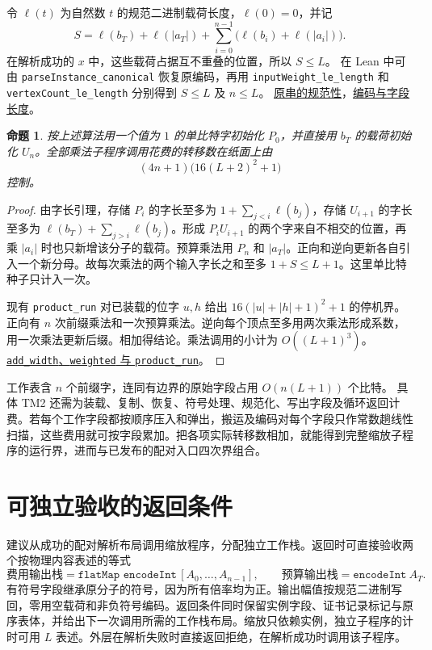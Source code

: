 \documentclass[UTF8,fontset=fandol,11pt,a4paper]{ctexart}
\newtheorem{proposition}{命题}
\newcommand{\len}[1]{\lvert #1\rvert}
\newcommand{\src}[2]{\href{https://github.com/huam54925-cpu/uav-routing-certification/blob/b083efc56ecf5b4f96f2e5b06134d1ed05806351/LeanCompletion/UAV/#1.lean}{#2}}
\begin{document}
令 \(\ell(t)\) 为自然数 \(t\) 的规范二进制载荷长度，\(\ell(0)=0\)，并记
\[
 S=\ell(b_T)+\ell(\lvert a_T\rvert)
   +\sum_{i=0}^{n-1}\bigl(\ell(b_i)+\ell(\lvert a_i\rvert)\bigr).
\]
在解析成功的 \(x\) 中，这些载荷占据互不重叠的位置，所以 \(S\le L\)。
在 Lean 中可由 \texttt{parseInstance\_canonical} 恢复原编码，再用
\texttt{inputWeight\_le\_length} 和 \texttt{vertexCount\_le\_length}
分别得到 \(S\le L\) 及 \(n\le L\)。
\src{TreeBudgetSparseVerifier}{原串的规范性}，\src{TreeBudgetBinaryCodec}{编码与字段长度}。

\begin{proposition}
按上述算法用一个值为 \(1\) 的单比特字初始化 \(P_0\)，并直接用 \(b_T\) 的载荷初始化 \(U_n\)。全部乘法子程序调用花费的转移数在纸面上由
\[
       (4n+1)\bigl(16(L+2)^2+1\bigr)
\]
控制。
\end{proposition}
\begin{proof}
由字长引理，存储 \(P_i\) 的字长至多为
\(1+\sum_{j<i}\ell(b_j)\)，存储 \(U_{i+1}\) 的字长至多为
\(\ell(b_T)+\sum_{j>i}\ell(b_j)\)。形成 \(P_iU_{i+1}\) 的两个字来自不相交的位置，再乘 \(\lvert a_i\rvert\) 时也只新增该分子的载荷。预算乘法用 \(P_n\) 和 \(\lvert a_T\rvert\)。正向和逆向更新各自引入一个新分母。故每次乘法的两个输入字长之和至多 \(1+S\le L+1\)。这里单比特种子只计入一次。

现有 \texttt{product\_run} 对已装载的位字 \(u,h\) 给出
\(16(\len{u}+\len{h}+1)^2+1\) 的停机界。正向有 \(n\) 次前缀乘法和一次预算乘法。逆向每个顶点至多用两次乘法形成系数，用一次乘法更新后缀。相加得结论。乘法调用的小计为 \(O((L+1)^3)\)。
\src{TreeBudgetWeightedRuns}{\texttt{add\_width}、\texttt{weighted} 与 \texttt{product\_run}}。
\end{proof}

工作表含 \(n\) 个前缀字，连同有边界的原始字段占用 \(O(n(L+1))\) 个比特。
具体 TM2 还需为装载、复制、恢复、符号处理、规范化、写出字段及循环返回计费。若每个工作字段都按顺序压入和弹出，搬运及编码对每个字段只作常数趟线性扫描，这些费用就可按字段累加。把各项实际转移数相加，就能得到完整缩放子程序的运行界，进而与已发布的配对入口四次界组合。

\section{可独立验收的返回条件}

建议从成功的配对解析布局调用缩放程序，分配独立工作栈。返回时可直接验收两个按物理内容表述的等式
\[
 \text{费用输出栈}=\texttt{flatMap encodeInt}\,[A_0,\ldots,A_{n-1}],
 \qquad
 \text{预算输出栈}=\texttt{encodeInt}\ A_T .
\]
有符号字段继承原分子的符号，因为所有倍率均为正。输出幅值按规范二进制写回，零用空载荷和非负符号编码。返回条件同时保留实例字段、证书记录标记与原序表体，并给出下一次调用所需的工作栈布局。缩放只依赖实例，独立子程序的计时可用 \(L\) 表述。外层在解析失败时直接返回拒绝，在解析成功时调用该子程序。
\end{document}
